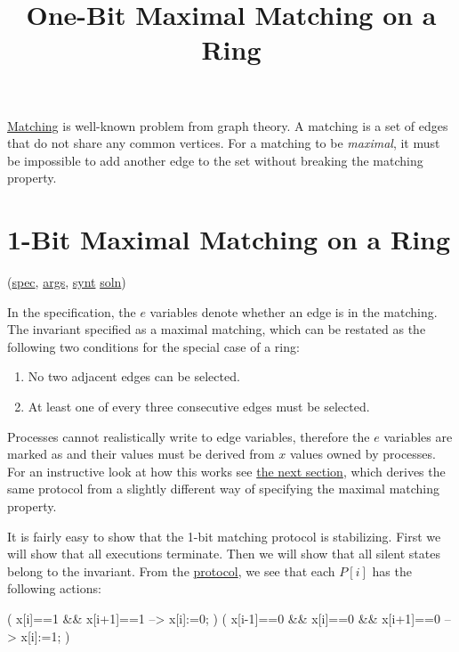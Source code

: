 
\title{One-Bit Maximal Matching on a Ring}
\date{}



\href{http://en.wikipedia.org/wiki/Matching_(graph_theory)}{Matching} is well-known problem from graph theory.
A matching is a set of edges that do not share any common vertices.
For a matching to be \textit{maximal}, it must be impossible to add another edge to the set without breaking the matching property.

\tableofcontents

\section{1-Bit Maximal Matching on a Ring}
\label{sec:MatchRing}

(\href{\examplespec/MatchRing.prot}{spec},
\href{\examplesett/MatchRing.args}{args},
\href{\examplesynt/MatchRing.prot}{synt}
\href{\examplesoln/MatchRingOneBit.prot}{soln})

In the specification, the $e$ variables denote whether an edge is in the matching.
The invariant specified as a maximal matching, which can be restated as the following two conditions for the special case of a ring:
\begin{enumerate}
\item No two adjacent edges can be selected.
\item At least one of every three consecutive edges must be selected.
\end{enumerate}

Processes cannot realistically write to edge variables, therefore the $e$ variables are marked as  and their values must be derived from $x$ values owned by processes.
For an instructive look at how this works see \href{#sec:MatchRingOneBit}{the next section}, which derives the same protocol from a slightly different way of specifying the maximal matching property.

It is fairly easy to show that the 1-bit matching protocol is stabilizing.
First we will show that all executions terminate.
Then we will show that all silent states belong to the invariant.
From the \href{\examplesoln/MatchRingOneBit.prot}{protocol}, we see that each $P[i]$ has the following actions:
\begin{code}
(              x[i]==1 && x[i+1]==1 --> x[i]:=0; )
( x[i-1]==0 && x[i]==0 && x[i+1]==0 --> x[i]:=1; )
\end{code}

